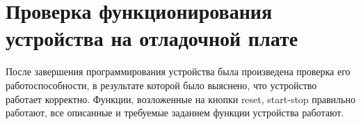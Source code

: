\begin{sloppypar}
\section{Проверка функционирования устройства на отладочной плате} %
После завершения программирования устройства была произведена проверка его работоспособности, в результате которой было выяснено, что устройство работает корректно. Функции, возложенные на кнопки reset, start-stop правильно работают, все описанные и требуемые заданием функции устройства работают.

\end{sloppypar}
